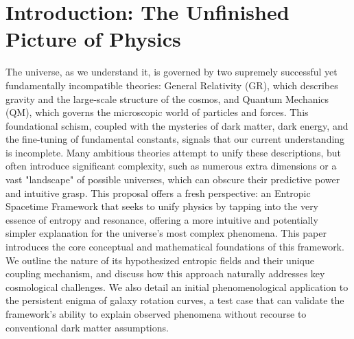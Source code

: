 \documentclass[11pt,a4paper]{article} %
\begin{document}
\section{Introduction: The Unfinished Picture of Physics}
The universe, as we understand it, is governed by two supremely successful yet fundamentally incompatible theories: General Relativity (GR),\cite{Einstein1916} which describes gravity and the large-scale structure of the cosmos, and Quantum Mechanics (QM), which governs the microscopic world of particles and forces. This foundational schism, coupled with the mysteries of dark matter, dark energy, and the fine-tuning of fundamental constants, signals that our current understanding is incomplete. Many ambitious theories attempt to unify these descriptions, but often introduce significant complexity, such as numerous extra dimensions or a vast "landscape" of possible universes, which can obscure their predictive power and intuitive grasp. This proposal offers a fresh perspective: an Entropic Spacetime Framework that seeks to unify physics by tapping into the very essence of entropy and resonance, offering a more intuitive and potentially simpler explanation for the universe's most complex phenomena. This paper introduces the core conceptual and mathematical foundations of this framework. We outline the nature of its hypothesized entropic fields and their unique coupling mechanism, and discuss how this approach naturally addresses key cosmological challenges. We also detail an initial phenomenological application to the persistent enigma of galaxy rotation curves, a test case that can validate the framework's ability to explain observed phenomena without recourse to conventional dark matter assumptions.
\end{document}
